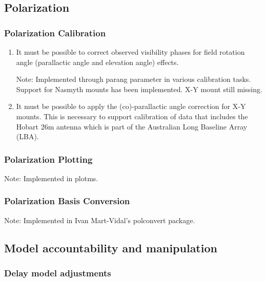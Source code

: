 \documentclass[11pt,a4paper]{article}
\begin{document}
\subsection{Polarization}

\subsubsection{Polarization Calibration}

\begin{enumerate}[subsubseclist]

\item It must be possible to correct observed visibility phases for
  field rotation angle (parallactic angle and elevation angle)
  effects.

  Note: Implemented through parang parameter in various calibration
  tasks.  Support for Nasmyth mounts has been implemented.  X-Y mount
  still missing.

\item It must be possible to apply the (co)-parallactic angle
  correction for X-Y mounts.  This is necessary to support calibration
  of data that includes the Hobart 26m antenna which is part of the
  Australian Long Baseline Array (LBA).

\end{enumerate}

\subsubsection{Polarization Plotting}

Note: Implemented in plotms.

\subsubsection{Polarization Basis Conversion}

Note: Implemented in Ivan Mart-Vidal's polconvert package.


\subsection{Model accountability and manipulation}

\subsubsection{Delay model adjustments}
\end{document}
